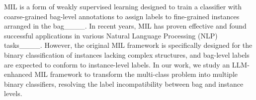 MIL is a form of weakly supervised learning designed to train a classifier with coarse-grained bag-level annotations to assign labels to fine-grained instances arranged in the bag____. 
In recent years, MIL has proven effective and found successful applications in various Natural Language Processing (NLP) tasks____.
However, the original MIL framework is specifically designed for the binary classification of instances lacking complex structures, and bag-level labels are expected to conform to instance-level labels. 
In our work, we study an LLM-enhanced MIL framework to transform the multi-class problem into multiple binary classifiers, resolving the label incompatibility between bag and instance levels.

